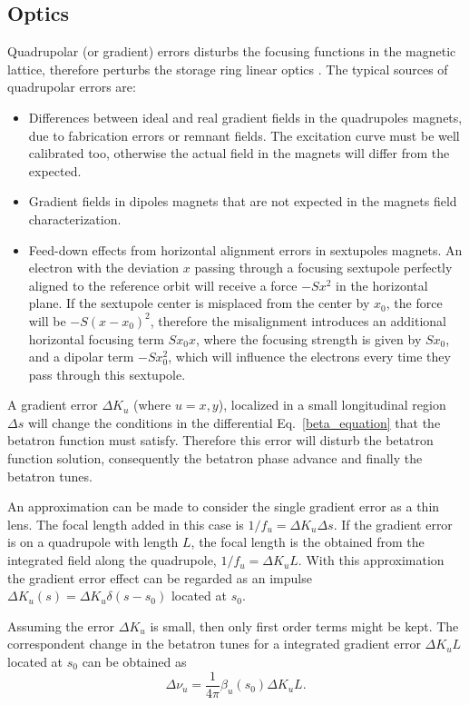 \subsection{Optics}\label{subsec:optics}
Quadrupolar (or gradient) errors disturbs the focusing functions in the magnetic lattice, therefore perturbs the storage ring linear optics . The typical sources of quadrupolar errors are:
\begin{itemize}
    \item Differences between ideal and real gradient fields in the quadrupoles magnets, due to fabrication errors or remnant fields. The excitation curve must be well calibrated too, otherwise the actual field in the magnets will differ from the expected. 
    \item Gradient fields in dipoles magnets that are not expected in the magnets field characterization.
    \item Feed-down effects from horizontal alignment errors in sextupoles magnets. An electron with the deviation $x$ passing through a focusing sextupole perfectly aligned to the reference orbit will receive a force $-Sx^2$ in the horizontal plane. If the sextupole center is misplaced from the center by $x_0$, the force will be $-S(x - x_0)^2$, therefore the misalignment introduces an additional horizontal focusing term $ Sx_0 x$, where the focusing strength is given by $Sx_0$, and a dipolar term $-S x_0^2$, which will influence the electrons every time they pass through this sextupole.
\end{itemize}

A gradient error $\Delta K_u$ (where $u=x, y$), localized in a small longitudinal region $\Delta s$ will change the conditions in the differential Eq.~\eqref{beta_equation} that the betatron function must satisfy. Therefore this error will disturb the betatron function solution, consequently the betatron phase advance and finally the betatron tunes.

An approximation can be made to consider the single gradient error as a thin lens. The focal length added in this case is $1/f_u = \Delta K_u \Delta s$. If the gradient error is on a quadrupole with length $L$, the focal length is the obtained from the integrated field along the quadrupole, $1/f_u = \Delta K_u L$. With this approximation the gradient error effect can be regarded as an impulse $\Delta K_u(s) = \Delta K_u \delta(s-s_0)$ located at $s_0$.

Assuming the error $\Delta K_u$ is small, then only first order terms might be kept. The correspondent change in the betatron tunes for a integrated gradient error $\Delta K_u L$ located at $s_0$ can be obtained as
\begin{equation}
    \Delta \nu_u = \dfrac{1}{4 \pi} \beta_u (s_0) \Delta K_u L.
\end{equation}

